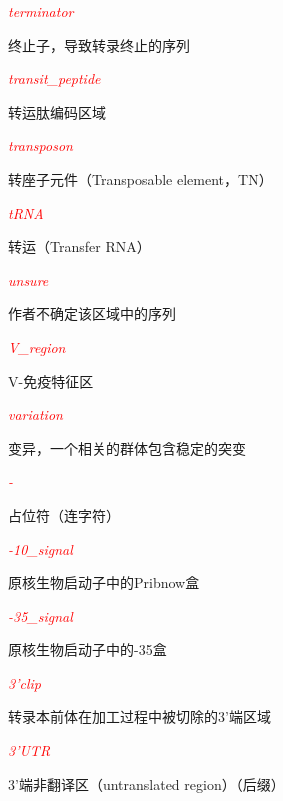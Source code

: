 \textcolor{red}{\textit{terminator}}
\begin{adjustwidth}{1cm}{}
终止子，导致转录终止的序列
\end{adjustwidth}

\textcolor{red}{\textit{transit\_peptide}}
\begin{adjustwidth}{1cm}{}
转运肽编码区域
\end{adjustwidth}

\textcolor{red}{\textit{transposon}}
\begin{adjustwidth}{1cm}{}
转座子元件（Transposable element，TN）
\end{adjustwidth}

\textcolor{red}{\textit{tRNA}}
\begin{adjustwidth}{1cm}{}
转运（Transfer RNA）
\end{adjustwidth}

\textcolor{red}{\textit{unsure}}
\begin{adjustwidth}{1cm}{}
作者不确定该区域中的序列
\end{adjustwidth}

\textcolor{red}{\textit{V\_region}}
\begin{adjustwidth}{1cm}{}
V-免疫特征区
\end{adjustwidth}

\textcolor{red}{\textit{variation}}
\begin{adjustwidth}{1cm}{}
变异，一个相关的群体包含稳定的突变
\end{adjustwidth}

\textcolor{red}{\textit{-}}
\begin{adjustwidth}{1cm}{}
占位符（连字符）
\end{adjustwidth}

\textcolor{red}{\textit{-10\_signal}}
\begin{adjustwidth}{1cm}{}
原核生物启动子中的Pribnow盒
\end{adjustwidth}

\textcolor{red}{\textit{-35\_signal}}
\begin{adjustwidth}{1cm}{}
原核生物启动子中的-35盒
\end{adjustwidth}

\textcolor{red}{\textit{3'clip}}
\begin{adjustwidth}{1cm}{}
转录本前体在加工过程中被切除的3'端区域
\end{adjustwidth}

\textcolor{red}{\textit{3'UTR}}
\begin{adjustwidth}{1cm}{}
3'端非翻译区（untranslated region）（后缀）
\end{adjustwidth}

